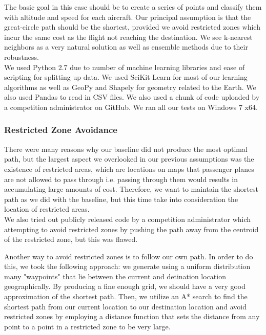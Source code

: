 \documentclass{article}[12pt]
\begin{document}
\begin{multicols}{2}
The basic goal in this case should be to create a series of points and classify them with altitude and speed for each aircraft. Our principal assumption is that the great-circle path should be the shortest, provided we avoid restricted zones which incur the same cost as the flight not reaching the destination. We see k-nearest neighbors as a very natural solution as well as ensemble methods due to their robustness.\\

We used Python 2.7 due to number of machine learning libraries and ease of scripting for splitting up data. We used SciKit Learn for most of our learning algorithms as well as GeoPy and Shapely for geometry related to the Earth. We also used Pandas to read in CSV files. We also used a chunk of code uploaded by a competition administrator on GitHub. We ran all our tests on Windows 7 x64.

\subsubsection{Restricted Zone Avoidance}

There were many reasons why our baseline did not produce the most optimal path, but the largest aspect we overlooked in our previous assumptions was the existence of restricted areas, which are locations on maps that passenger planes are not allowed to pass through i.e. passing through them would results in accumulating large amounts of cost. Therefore, we want to maintain the shortest path as we did with the baseline, but this time take into consideration the location of restricted areas.\\

We also tried out publicly released code by a competition administrator which attempting to avoid restricted zones by pushing the path away from the centroid of the restricted zone, but this was flawed.

Another way to avoid restricted zones is to follow our own path. In order to do this, we took the following approach: we generate using a uniform distribution many "waypoints" that lie between the current and detination location geographically. By producing a fine enough grid, we should have a very good approximation of the shortest path. Then, we utilize an A* search to find the shortest path from our current location to our destination location and avoid restricted zones by employing a distance function that sets the distance from any point to a point in a restricted zone to be very large.


\end{multicols}
\end{document}
